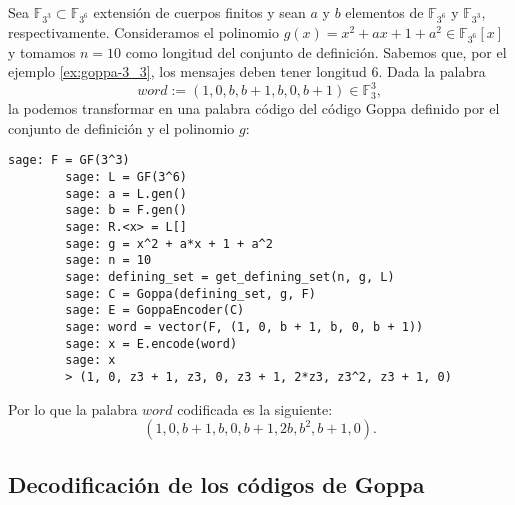 \begin{exampleth}
    Sea $\mathbb{F}_{3^3} \subset \mathbb{F}_{3^6}$ extensión de cuerpos finitos y sean $a$ y $b$ elementos de $\mathbb{F}_{3^6}$ y $\mathbb{F}_{3^3}$, respectivamente. Consideramos el polinomio $g(x) = x^2 + ax + 1 + a^2 \in \mathbb{F}_{3^6}[x]$ y tomamos $n = 10$ como longitud del conjunto de definición. Sabemos que, por el ejemplo \ref{ex:goppa-3_3}, los mensajes deben tener longitud $6$. Dada la palabra
    \[
        word := (1, 0, b, b + 1, b, 0, b + 1) \in \mathbb{F}_3^3,
    \]
    la podemos transformar en una palabra código del código Goppa definido por el conjunto de definición y el polinomio $g$:

    \begin{lstlisting}[gobble=4]
        sage: F = GF(3^3)
        sage: L = GF(3^6)
        sage: a = L.gen()
        sage: b = F.gen()
        sage: R.<x> = L[]
        sage: g = x^2 + a*x + 1 + a^2
        sage: n = 10
        sage: defining_set = get_defining_set(n, g, L)
        sage: C = Goppa(defining_set, g, F)
        sage: E = GoppaEncoder(C)
        sage: word = vector(F, (1, 0, b + 1, b, 0, b + 1))
        sage: x = E.encode(word)
        sage: x
        > (1, 0, z3 + 1, z3, 0, z3 + 1, 2*z3, z3^2, z3 + 1, 0)
    \end{lstlisting}

    Por lo que la palabra $word$ codificada es la siguiente:
    \[
        (1, 0, b + 1, b, 0, b + 1, 2b, b^2, b + 1, 0).
    \]
\end{exampleth}

\subsection{Decodificación de los códigos de Goppa}

